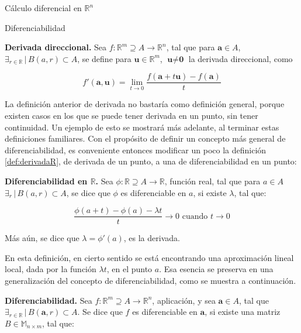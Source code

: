 \begin{chapter}{Cálculo diferencial en $\mathbb{R}^n$}
\begin{section}{Diferenciabilidad}
\begin{defn}
\label{def:derivadaDirec}
\textbf{Derivada direccional.} Sea $f: \mathbb{R}^m \supseteq A \longrightarrow \mathbb{R}^n$, tal que para $\textbf{a} \in A$, $\exists_{r \in \mathbb{R}} \, | \, B(a,r)\subset A$, se define para $\textbf{u} \in \mathbb{R}^m$, $\textbf{u} \neq \textbf{0}$ la derivada direccional, como 

\begin{equation}
    f'(\textbf{a},\textbf{u}) = \lim_{t \rightarrow 0} \frac{f(\textbf{a}+t\textbf{u}) - f(\textbf{a})}{t}
\end{equation}
\end{defn}

La definición anterior de derivada no bastaría como definición general, porque existen casos en los que se puede tener derivada en un punto, sin tener continuidad. Un ejemplo de esto se mostrará más adelante, al terminar estas definiciones familiares. Con el propósito de definir un concepto más general de diferenciabilidad, es conveniente entonces modificar un poco la definición \ref{def:derivadaR}, de derivada de un punto, a una de diferenciabilidad en un punto:

\begin{defn}
\textbf{Diferenciabilidad en $\mathbb{R}$.} Sea $\phi: \mathbb{R} \supseteq A \longrightarrow \mathbb{R}$, función real, tal que para $a \in A$ $\exists_r \, | \, B(a, r) \subset A$, se dice que $\phi$ es diferenciable en $a$, si existe $\lambda$, tal que:

\begin{equation}
    \frac{\phi(a + t)-\phi(a)-\lambda t}{t}\rightarrow 0 \text{ cuando } t \rightarrow 0
\end{equation}

Más aún, se dice que $\lambda = \phi'(a)$, es la derivada.
\end{defn}

En esta definición, en cierto sentido se está encontrando una aproximación lineal local, dada por la función $\lambda t$, en el punto $a$. Esa esencia se preserva en una generalización del concepto de diferenciabilidad, como se muestra a continuación.

\begin{defn}
\label{def:DiferenGeneral}
\textbf{Diferenciabilidad.} Sea $f:\mathbb{R}^m\supseteq A \longrightarrow \mathbb{R}^n$, aplicación, y sea $\textbf{a} \in A$, tal que $\exists_{r\in\mathbb{R}}\,|\, B(\textbf{a},r)\subset A$. Se dice que $f$ es diferenciable en $\textbf{a}$, si existe una matriz $B \in \mathbb{M}_{n\times m}$, tal que:


\end{defn}
\end{section}
\end{chapter}
